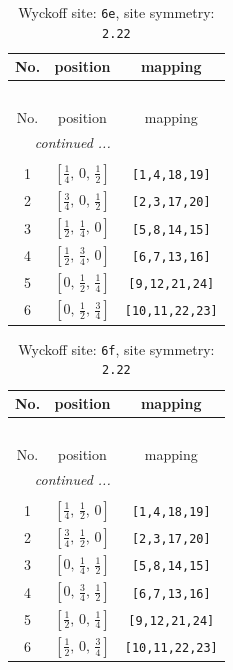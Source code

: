 \documentclass[fleqn,8pt]{jsarticle}
\begin{document}
\renewcommand{\arraystretch}{1.2}
\begin{longtable}{ccc}
\caption{Wyckoff site: {\tt 6e}, site symmetry: {\tt 2.22}}
 \\
 \hline \hline
No. & position & mapping \\ \hline \endfirsthead

\multicolumn{2}{l}{\tablename\ \thetable{}} \\
 \hline \hline
No. & position & mapping \\ \hline \endhead

 \hline \hline
\multicolumn{2}{r}{\footnotesize\it continued ...} \\ \endfoot

 \hline \hline
\multicolumn{2}{r}{} \\ \endlastfoot

1 & $\left[ \frac{1}{4},\, 0,\, \frac{1}{2} \right]$ & {\tt [1,4,18,19]} \\ \hline
2 & $\left[ \frac{3}{4},\, 0,\, \frac{1}{2} \right]$ & {\tt [2,3,17,20]} \\ \hline
3 & $\left[ \frac{1}{2},\, \frac{1}{4},\, 0 \right]$ & {\tt [5,8,14,15]} \\ \hline
4 & $\left[ \frac{1}{2},\, \frac{3}{4},\, 0 \right]$ & {\tt [6,7,13,16]} \\ \hline
5 & $\left[ 0,\, \frac{1}{2},\, \frac{1}{4} \right]$ & {\tt [9,12,21,24]} \\ \hline
6 & $\left[ 0,\, \frac{1}{2},\, \frac{3}{4} \right]$ & {\tt [10,11,22,23]} \\
\end{longtable}
\renewcommand{\arraystretch}{1.2}
\begin{longtable}{ccc}
\caption{Wyckoff site: {\tt 6f}, site symmetry: {\tt 2.22}}
 \\
 \hline \hline
No. & position & mapping \\ \hline \endfirsthead

\multicolumn{2}{l}{\tablename\ \thetable{}} \\
 \hline \hline
No. & position & mapping \\ \hline \endhead

 \hline \hline
\multicolumn{2}{r}{\footnotesize\it continued ...} \\ \endfoot

 \hline \hline
\multicolumn{2}{r}{} \\ \endlastfoot

1 & $\left[ \frac{1}{4},\, \frac{1}{2},\, 0 \right]$ & {\tt [1,4,18,19]} \\ \hline
2 & $\left[ \frac{3}{4},\, \frac{1}{2},\, 0 \right]$ & {\tt [2,3,17,20]} \\ \hline
3 & $\left[ 0,\, \frac{1}{4},\, \frac{1}{2} \right]$ & {\tt [5,8,14,15]} \\ \hline
4 & $\left[ 0,\, \frac{3}{4},\, \frac{1}{2} \right]$ & {\tt [6,7,13,16]} \\ \hline
5 & $\left[ \frac{1}{2},\, 0,\, \frac{1}{4} \right]$ & {\tt [9,12,21,24]} \\ \hline
6 & $\left[ \frac{1}{2},\, 0,\, \frac{3}{4} \right]$ & {\tt [10,11,22,23]} \\
\end{longtable}
\end{document}
